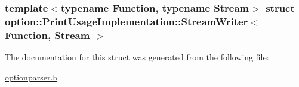 \subsubsection*{template$<$typename Function, typename Stream$>$ struct option\-::\-Print\-Usage\-Implementation\-::\-Stream\-Writer$<$ Function, Stream $>$}



\-The documentation for this struct was generated from the following file\-:\begin{DoxyCompactItemize}
\item 
\hyperlink{optionparser_8h}{optionparser.\-h}\end{DoxyCompactItemize}
